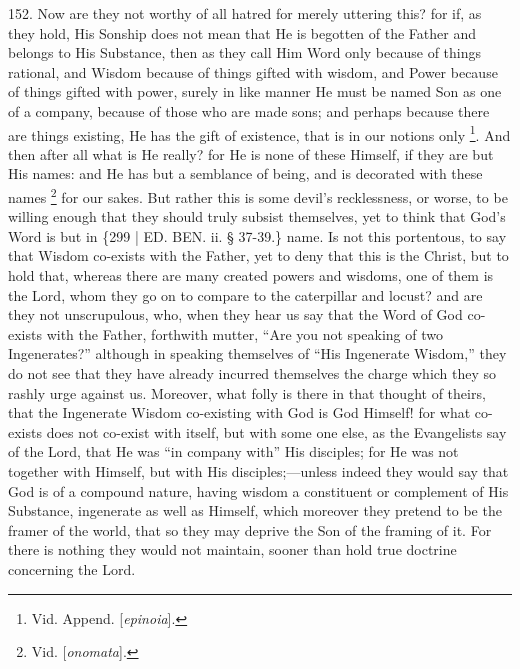 152. Now are they not worthy
of all hatred for merely uttering this? for if, as they hold, His
Sonship does not mean that He is begotten of the Father and belongs to
His Substance, then as they call Him Word only because of things
rational, and Wisdom because of things gifted with wisdom, and Power
because of things gifted with power, surely in like manner He must be
named Son as one of a company, because of those who are made sons; and
perhaps because there are things existing, He has the gift of
existence, that is in our notions only \footnote{Vid. Append. [\emph{epinoia}].}. And then after all what is He really? for He is none of these
Himself, if they are but His names: and He has but a semblance of
being, and is decorated with these names \footnote{Vid. [\emph{onomata}].} for our sakes. But rather this is some devil's recklessness, or
worse, to be willing enough that they should truly subsist themselves,
yet to think that God's Word is but in \{299 | ED. BEN. ii. § 37-39.\} name.
Is not this portentous, to say that Wisdom co-exists with the Father,
yet to deny that this is the Christ, but to hold that, whereas there
are many created powers and wisdoms, one of them is the Lord, whom
they go on to compare to the caterpillar and locust? and are they not
unscrupulous, who, when they hear us say that the Word of God
co-exists with the Father, forthwith mutter, ``Are you not speaking of
two Ingenerates?'' although in speaking themselves of ``His Ingenerate
Wisdom,'' they do not see that they have already incurred themselves
the charge which they so rashly urge against us. Moreover, what folly
is there in that thought of theirs, that the Ingenerate Wisdom
co-existing with God is God Himself! for what co-exists does not
co-exist with itself, but with some one else, as the Evangelists say
of the Lord, that He was ``in company with'' His disciples; for He was
not together with Himself, but with His disciples;—unless indeed
they would say that God is of a compound nature, having wisdom a
constituent or complement of His Substance, ingenerate as well as
Himself, which moreover they pretend to be the framer of the world,
that so they may deprive the Son of the framing of it. For there is
nothing they would not maintain, sooner than hold true doctrine
concerning the Lord.

